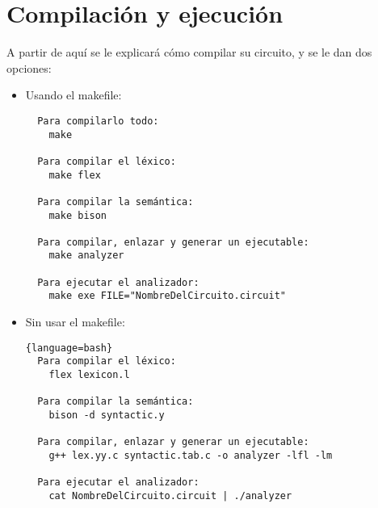 \documentclass{article}
\begin{document}
\section{Compilación y ejecución}

\lstset{style=bash}

A partir de aquí se le explicará cómo compilar su circuito, y se le dan dos opciones:
\begin{itemize}
\item Usando el makefile:
  \begin{lstlisting}
  Para compilarlo todo:
    make

  Para compilar el léxico:
    make flex

  Para compilar la semántica:
    make bison

  Para compilar, enlazar y generar un ejecutable:
    make analyzer

  Para ejecutar el analizador:
    make exe FILE="NombreDelCircuito.circuit"
\end{lstlisting}

\newpage

\item Sin usar el makefile:
\begin{lstlisting}[basicstyle=\footnotesize]{language=bash}
  Para compilar el léxico:
    flex lexicon.l

  Para compilar la semántica:
    bison -d syntactic.y

  Para compilar, enlazar y generar un ejecutable:
    g++ lex.yy.c syntactic.tab.c -o analyzer -lfl -lm

  Para ejecutar el analizador:
    cat NombreDelCircuito.circuit | ./analyzer

\end{lstlisting}
\end{itemize}
\end{document}
